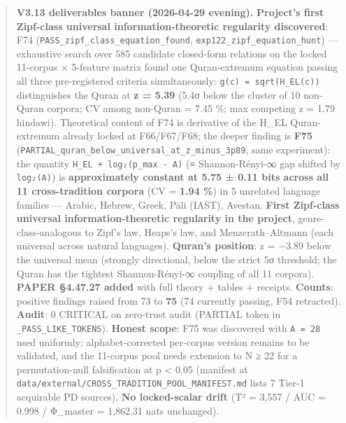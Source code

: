\documentclass[
]{article}
\begin{document}
\begin{quote}
\textbf{V3.13 deliverables banner (2026-04-29 evening).}
\textbf{Project's first Zipf-class universal information-theoretic
regularity discovered}: F74
(\texttt{PASS\_zipf\_class\_equation\_found},
\texttt{exp122\_zipf\_equation\_hunt}) --- exhaustive search over 585
candidate closed-form relations on the locked 11-corpus × 5-feature
matrix found one Quran-extremum equation passing all three
pre-registered criteria simultaneously: \texttt{g(c)\ =\ sqrt(H\_EL(c))}
distinguishes the Quran at \textbf{\textbar z\textbar{} = 5.39} (5.4σ
below the cluster of 10 non-Quran corpora; CV among non-Quran = 7.45 \%;
max competing \textbar z\textbar{} = 1.79 hindawi). Theoretical content
of F74 is derivative of the H\_EL Quran-extremum already locked at
F66/F67/F68; the deeper finding is \textbf{F75}
(\texttt{PARTIAL\_quran\_below\_universal\_at\_z\_minus\_3p89}, same
experiment): the quantity \texttt{H\_EL\ +\ log₂(p\_max\ ·\ A)} (≡
Shannon-Rényi-∞ gap shifted by \texttt{log₂(A)}) is
\textbf{approximately constant at 5.75 ± 0.11 bits across all 11
cross-tradition corpora} (CV = \textbf{1.94 \%}) in 5 unrelated language
families --- Arabic, Hebrew, Greek, Pāli (IAST), Avestan. \textbf{First
Zipf-class universal information-theoretic regularity in the project},
genre-class-analogous to Zipf's law, Heaps's law, and Menzerath--Altmann
(each universal across natural languages). \textbf{Quran's position}: z
= −3.89 below the universal mean (strongly directional, below the strict
5σ threshold; the Quran has the tightest Shannon-Rényi-∞ coupling of all
11 corpora). \textbf{PAPER §4.47.27 added} with full theory + tables +
receipts. \textbf{Counts}: positive findings raised from 73 to
\textbf{75} (74 currently passing, F54 retracted). \textbf{Audit}: 0
CRITICAL on zero-trust audit (PARTIAL token in
\texttt{\_PASS\_LIKE\_TOKENS}). \textbf{Honest scope}: F75 was
discovered with \texttt{A\ =\ 28} used uniformly; alphabet-corrected
per-corpus version remains to be validated, and the 11-corpus pool needs
extension to N ≥ 22 for a permutation-null falsification at p
\textless{} 0.05 (manifest at
\texttt{data/external/CROSS\_TRADITION\_POOL\_MANIFEST.md} lists 7
Tier-1 acquirable PD sources). \textbf{No locked-scalar drift} (T² =
3,557 / AUC = 0.998 / Φ\_master = 1,862.31 nats unchanged).
\end{quote}
\end{document}
